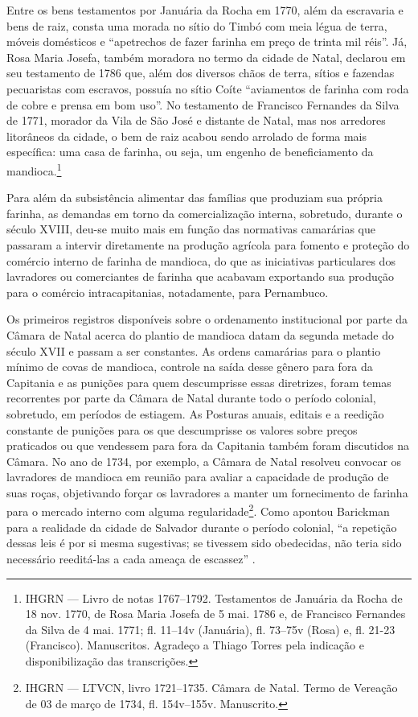 \begin{refsection}
Entre os bens testamentos por Januária da Rocha em 1770, além da escravaria e bens de raiz, consta uma morada no sítio do Timbó com meia légua de terra, móveis domésticos e “apetrechos de fazer farinha em preço de trinta mil réis”. Já, Rosa Maria Josefa, também moradora no termo da cidade de Natal, declarou em seu testamento de 1786 que, além dos diversos chãos de terra, sítios e fazendas pecuaristas com escravos, possuía no sítio Coíte “aviamentos de farinha com roda de cobre e prensa em bom uso”. No testamento de Francisco Fernandes da Silva de 1771, morador da Vila de São José e distante de Natal, mas nos arredores litorâneos da cidade, o bem de raiz acabou sendo arrolado de forma mais específica: uma casa de farinha, ou seja, um engenho de beneficiamento da mandioca.\footnote{IHGRN --- Livro de notas 1767--1792. Testamentos de Januária da Rocha de 18 nov. 1770, de Rosa Maria Josefa de 5 mai. 1786 e, de Francisco Fernandes da Silva de 4 mai. 1771; fl. 11--14v (Januária), fl. 73--75v (Rosa) e, fl. 21-23 (Francisco). Manuscritos. Agradeço a Thiago Torres pela indicação e disponibilização das transcrições.}

Para além da subsistência alimentar das famílias que produziam sua própria farinha, as demandas em torno da comercialização interna, sobretudo, durante o século XVIII, deu-se muito mais em função das normativas camarárias que passaram a intervir diretamente na produção agrícola para fomento e proteção do comércio interno de farinha de mandioca, do que as iniciativas particulares dos lavradores ou comerciantes de farinha que acabavam exportando sua produção para o comércio intracapitanias, notadamente, para Pernambuco. 

Os primeiros registros disponíveis sobre o ordenamento institucional por parte da Câmara de Natal acerca do plantio de mandioca datam da segunda metade do século XVII e passam a ser constantes. As ordens camarárias para o plantio mínimo de covas de mandioca, controle na saída desse gênero para fora da Capitania e as punições para quem descumprisse essas diretrizes, foram temas recorrentes por parte da Câmara de Natal durante todo o período colonial, sobretudo, em períodos de estiagem. As Posturas anuais, editais e a reedição constante de punições para os que descumprisse os valores sobre preços praticados ou que vendessem para fora da Capitania também foram discutidos na Câmara. No ano de 1734, por exemplo, a Câmara de Natal resolveu convocar os lavradores de mandioca em reunião para avaliar a capacidade de produção de suas roças, objetivando forçar os lavradores a manter um fornecimento de farinha para o mercado interno com alguma regularidade\footnote{IHGRN --- LTVCN, livro 1721--1735. Câmara de Natal. Termo de Vereação de 03 de março de 1734, fl. 154v--155v. Manuscrito.}. Como apontou Barickman para a realidade da cidade de Salvador durante o período colonial, “a repetição dessas leis é por si mesma sugestivas; se tivessem sido obedecidas, não teria sido necessário reeditá-las a cada ameaça de escassez” \cite[p.~105]{Barickman2003acucar}. 


\end{refsection}

